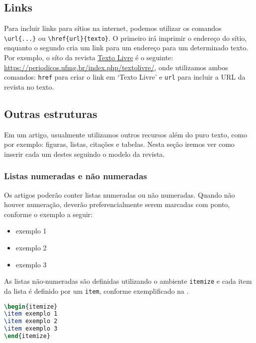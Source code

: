 \documentclass[portuguese]{textolivre}
\begin{document}
\subsection{Links}\label{sec-links}
Para incluir links para sítios na internet, podemos utilizar os comandos \verb|\url{...}|
ou \verb|\href{url}{texto}|. O primeiro irá imprimir o endereço do sítio,
enquanto o segundo cria um link para um endereço para um determinado texto.
Por exemplo, o síto da revista \href{https://periodicos.ufmg.br/index.php/textolivre/}{Texto Livre} é o seguinte:
\url{https://periodicos.ufmg.br/index.php/textolivre/},
onde utilizamos ambos comandos: \verb|href| para criar o link em `Texto Livre' e \verb|url| para incluir
a URL da revista no texto.

\subsection{Outras estruturas}\label{sec-outras-estr}
Em um artigo, usualmente utilizamos outros recursos além do puro texto, como por exemplo:
figuras, listas, citações e tabelas. Nesta seção iremos ver como inserir cada um destes
seguindo o modelo da revista.


\subsubsection{Listas numeradas e não numeradas}\label{sec-listas}
Os artigos poderão conter listas numeradas ou não numeradas.
Quando não houver numeração, deverão preferencialmente serem marcadas com ponto, conforme o exemplo a seguir:
\begin{itemize}
\item exemplo 1
\item exemplo 2
\item exemplo 3
\end{itemize}
As listas não-numeradas são definidas utilizando o ambiente \verb|itemize| e cada item da lista
é definido por um \verb|item|, conforme exemplificado na .
\begin{lstlisting}[language=tex, label=lst-itemize, caption={Listas não-numeradas.}]
\begin{itemize}
\item exemplo 1
\item exemplo 2
\item exemplo 3
\end{itemize}
\end{lstlisting} %
\end{document}
